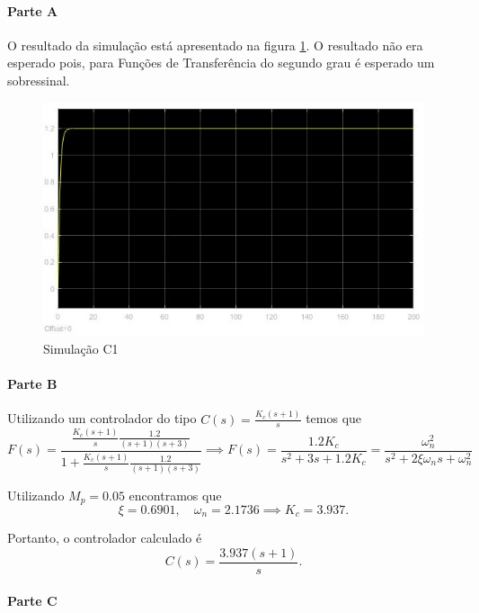 \documentclass[
]{book}
\theoremstyle{definition}
\theoremstyle{definition}
\theoremstyle{definition}
\theoremstyle{remark}
\begin{document}
\hypertarget{parte-a-7}{%
\paragraph{Parte A}\label{parte-a-7}}

O resultado da simulação está apresentado na figura \ref{fig:prob3A1}. O resultado não era esperado pois, para Funções de Transferência do segundo grau é esperado um sobressinal.

\begin{figure}

{\centering \includegraphics[width=0.8\linewidth]{Imagens/Lab5/Resolução/prob3A1} 

}

\caption{Simulação C1}\label{fig:prob3A1}
\end{figure}

\hypertarget{parte-b-7}{%
\paragraph{Parte B}\label{parte-b-7}}

Utilizando um controlador do tipo \(C(s) = \frac{K_c(s+1)}{s}\) temos que
\[
F(s) = \frac{\frac{K_c(s+1)}{s}\frac{1.2}{(s+1)(s+3)}}{1+\frac{K_c(s+1)}{s}\frac{1.2}{(s+1)(s+3)}} \implies \boxed{F(s) = \frac{1.2K_c}{s^2+3s+1.2K_c} = \frac{\omega_n^2}{s^2+2\xi\omega_ns+\omega_n^2}}
\]

Utilizando \(M_p = 0.05\) encontramos que
\[
\xi = 0.6901, \quad \omega_n = 2.1736 \implies K_c =3.937.
\]

Portanto, o controlador calculado é
\[
\boxed{C(s) = \frac{3.937(s+1)}{s}}.
\]

\hypertarget{parte-c-5}{%
\paragraph{Parte C}\label{parte-c-5}}
\end{document}
